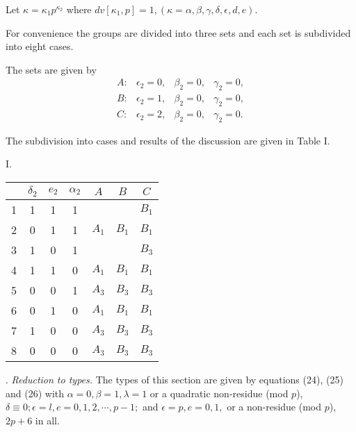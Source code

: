 \documentclass[oneside]{article}
\begin{document}
Let $\kappa = \kappa_1 p^{\kappa_2}$ where $dv[\kappa_1, p] = 1, (\kappa =
\alpha, \beta, \gamma, \delta, \epsilon, d, e)$.

For convenience the groups are divided into three sets and each set is
subdivided into eight cases.

The sets are given by
\begin{equation*}
\begin{matrix}
A: & \epsilon_2 = 0, & \beta_2 = 0, & \gamma_2 = 0, \\
B: & \epsilon_2 = 1, & \beta_2 = 0, & \gamma_2 = 0, \\
C: & \epsilon_2 = 2, & \beta_2 = 0, & \gamma_2 = 0.
\end{matrix}
\end{equation*}

The subdivision into cases and results of the discussion are given in
Table I.

\begin{center}
\large I. \normalsize

\smallskip
\begin{tabular}{|c|c|c|c|c|c|c|} \hline
   & $\delta_2$ & $e_2$ & $\alpha_2$ &  $A$  &  $B$  &  $C$  \\ \hline
 1 &     1      &   1   &      1     &       &       & $B_1$ \\ \hline
 2 &     0      &   1   &      1     & $A_1$ & $B_1$ & $B_1$ \\ \hline
 3 &     1      &   0   &      1     &       &       & $B_3$ \\ \hline
 4 &     1      &   1   &      0     & $A_1$ & $B_1$ & $B_1$ \\ \hline
 5 &     0      &   0   &      1     & $A_3$ & $B_3$ & $B_3$ \\ \hline
 6 &     0      &   1   &      0     & $A_1$ & $B_1$ & $B_1$ \\ \hline
 7 &     1      &   0   &      0     & $A_3$ & $B_3$ & $B_3$ \\ \hline
 8 &     0      &   0   &      0     & $A_3$ & $B_3$ & $B_3$ \\ \hline
\end{tabular}
\end{center}

. \textit{Reduction to types.} The types of this section are given by equations
(24), (25) and (26) with $\alpha = 0, \beta = 1, \lambda = 1$ or a
quadratic non-residue (mod $p$), $\delta \equiv 0; \epsilon = l, e = 0, 1,
2, \cdots, p - 1;$ and $\epsilon = p, e = 0, 1,$ or a
non-residue (mod $p$), $2p+6$ in all.
\end{document}
